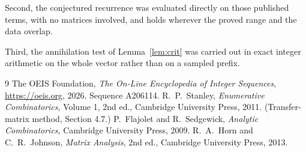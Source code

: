 \documentclass[11pt,a4paper]{article}
\theoremstyle{plain}
\theoremstyle{definition}
\begin{document}
Second, the conjectured recurrence was evaluated directly on those published terms, with no
matrices involved, and holds wherever the proved range and the data overlap.

Third, the annihilation test of Lemma~\ref{lem:crit} was carried out in exact integer
arithmetic on the whole vector rather than on a sampled prefix.

\begin{thebibliography}{9}
 The OEIS Foundation, \emph{The On-Line Encyclopedia of Integer
Sequences}, \url{https://oeis.org}, 2026. Sequence A206114.
 R.~P.~Stanley, \emph{Enumerative Combinatorics}, Volume 1, 2nd ed.,
Cambridge University Press, 2011. (Transfer-matrix method, Section 4.7.)
 P.~Flajolet and R.~Sedgewick, \emph{Analytic Combinatorics}, Cambridge
University Press, 2009.
 R.~A.~Horn and C.~R.~Johnson, \emph{Matrix Analysis}, 2nd ed., Cambridge
University Press, 2013.
\end{thebibliography}
\end{document}
